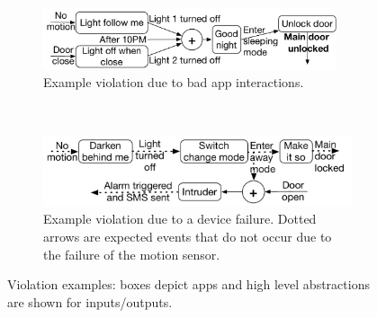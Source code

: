 \begin{figure}[tb]
	\ssp
    \centering
    \begin{subfigure}[t]{3.4in}
        \centering
        \includegraphics[width=3.4in]{violation_example}
		\caption{Example violation due to bad app interactions.}
        \label{violation_example}
    \end{subfigure}\\
    \vspace{0.03in}
    \begin{subfigure}[t]{3.6in}
        \centering
        \includegraphics[width=3.6in]{device_failure}
        \caption{Example violation due to a device failure. Dotted arrows are
expected events that do not occur due to the failure of the motion sensor.}
        \label{device_failure}
    \end{subfigure}
    \caption{Violation examples: boxes depict apps and high level abstractions are
shown for inputs/outputs.}
    \label{violationexamples}
\end{figure}

